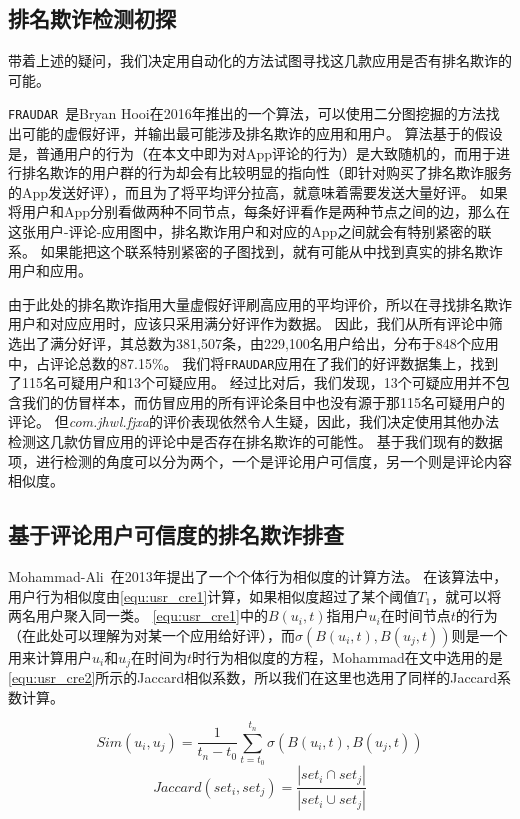 \subsection{排名欺诈检测初探}

带着上述的疑问，我们决定用自动化的方法试图寻找这几款应用是否有排名欺诈的可能。

\texttt{FRAUDAR}~\cite{hooi2016fraudar}是Bryan Hooi在2016年推出的一个算法，可以使用二分图挖掘的方法找出可能的虚假好评，并输出最可能涉及排名欺诈的应用和用户。
算法基于的假设是，普通用户的行为（在本文中即为对App评论的行为）是大致随机的，而用于进行排名欺诈的用户群的行为却会有比较明显的指向性（即针对购买了排名欺诈服务的App发送好评），而且为了将平均评分拉高，就意味着需要发送大量好评。
如果将用户和App分别看做两种不同节点，每条好评看作是两种节点之间的边，那么在这张用户-评论-应用图中，排名欺诈用户和对应的App之间就会有特别紧密的联系。
如果能把这个联系特别紧密的子图找到，就有可能从中找到真实的排名欺诈用户和应用。

由于此处的排名欺诈指用大量虚假好评刷高应用的平均评价，所以在寻找排名欺诈用户和对应应用时，应该只采用满分好评作为数据。
因此，我们从所有评论中筛选出了满分好评，其总数为381,507条，由229,100名用户给出，分布于848个应用中，占评论总数的87.15\%。
我们将\texttt{FRAUDAR}应用在了我们的好评数据集上，找到了115名可疑用户和13个可疑应用。
经过比对后，我们发现，13个可疑应用并不包含我们的仿冒样本，而仿冒应用的所有评论条目中也没有源于那115名可疑用户的评论。
但\emph{com.jhwl.fjxa}的评价表现依然令人生疑，因此，我们决定使用其他办法检测这几款仿冒应用的评论中是否存在排名欺诈的可能性。
基于我们现有的数据项，进行检测的角度可以分为两个，一个是评论用户可信度，另一个则是评论内容相似度。

\subsection{基于评论用户可信度的排名欺诈排查}

Mohammad-Ali~\cite{abbasi2013measuring}在2013年提出了一个个体行为相似度的计算方法。
在该算法中，用户行为相似度由\autoref{equ:usr_cre1}计算，如果相似度超过了某个阈值$T_1$，就可以将两名用户聚入同一类。
\autoref{equ:usr_cre1}中的$B(u_i, t)$指用户$u_i$在时间节点$t$的行为（在此处可以理解为对某一个应用给好评），而$\sigma(B(u_i, t), B(u_j, t))$则是一个用来计算用户$u_i$和$u_j$在时间为$t$时行为相似度的方程，Mohammad在文中选用的是\autoref{equ:usr_cre2}所示的Jaccard相似系数，所以我们在这里也选用了同样的Jaccard系数计算。

\begin{equation}
Sim(u_i, u_j) = \frac{1}{t_n - t_0}\sum_{t=t_0}^{t_n}\sigma(B(u_i, t), B(u_j, t))
\label{equ:usr_cre1}
\end{equation}
\begin{equation}
Jaccard(set_i, set_j) = \frac{|set_i \cap set_j|}{|set_i \cup set_j|}
\label{equ:usr_cre2}
\end{equation}
\vspace{0.5mm}

